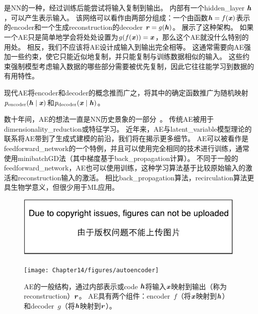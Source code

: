 \chapter{}
\label{chap:autoencoders}
是\gls{NN}的一种，经过训练后能尝试将输入复制到输出。
内部有一个\gls{hidden_layer} $\boldsymbol{\mathit{h}}$，可以产生表示输入。
该网络可以看作由两部分组成：一个由函数$ \boldsymbol{\mathit{h}} = f(\boldsymbol{\mathit{x}})$表示的\gls{encoder}和一个生成\gls{reconstruction}的\gls{decoder} $\boldsymbol{\mathit{r}}=g(\boldsymbol{\mathit{h}})$。
展示了这种架构。
如果一个\gls{AE}只是简单地学会将处处设置为$g(f(\boldsymbol{\mathit{x}})) =\boldsymbol{\mathit{x}}$，那么这个\gls{AE}就没什么特别的用处。
相反，我们不应该将\gls{AE}设计成输入到输出完全相等。
这通常需要向\gls{AE}强加一些约束，使它只能近似地复制，并只能复制与训练数据相似的输入。
这些约束强制模型考虑输入数据的哪些部分需要被优先复制，因此它往往能学习到数据的有用特性。


现代\gls{AE}将\gls{encoder}和\gls{decoder}的概念推而广之，将其中的确定函数推广为随机映射$p_{\text{encoder}} (\boldsymbol{\mathit{h}} \mid \boldsymbol{\mathit{x}})$和$p_{\text{decoder}}(\boldsymbol{\mathit{x}} \mid \boldsymbol{\mathit{h}})$。


数十年间，\gls{AE}的想法一直是\gls{NN}历史景象的一部分~\citep{Lecun-these87,Bourlard88,hinton1994amd-small}。
传统\gls{AE}被用于\gls{dimensionality_reduction}或特征学习。
近年来，\gls{AE}与\gls{latent_variable}模型理论的联系将\gls{AE}带到了生成式建模的前沿，我们将在揭示更多细节。
\gls{AE}可以被看作是\gls{feedforward_network}的一个特例，并且可以使用完全相同的技术进行训练，通常使用\gls{minibatch}\gls{GD}法（其中梯度基于\gls{back_propagation}计算）。
不同于一般的\gls{feedforward_network}，\gls{AE}也可以使用训练\citep{Hinton+McClelland-NIPS1987}，这种学习算法基于比较原始输入的激活和\gls{reconstruction}输入的激活。
相比\gls{back_propagation}算法，\gls{recirculation}算法更具生物学意义，但很少用于\gls{ML}应用。

\begin{figure}[!htb]
\ifOpenSource
\centerline{\includegraphics{figure.pdf}}
\else
\centerline{\texttt{[image: Chapter14/figures/autoencoder]}}
\fi
\caption{\gls{AE}的一般结构，通过内部表示或\gls{code} $\boldsymbol{\mathit{h}}$将输入$\boldsymbol{\mathit{x}}$映射到输出（称为\gls{reconstruction}）$\boldsymbol{\mathit{r}}$。
\gls{AE}具有两个组件：\gls{encoder}~$f$（将$\boldsymbol{\mathit{x}}$映射到$\boldsymbol{\mathit{h}}$）和\gls{decoder}~$g$（将$\boldsymbol{\mathit{h}}$映射到$\boldsymbol{\mathit{r}}$）。
}
\label{fig:chap14_autoencoder}
\end{figure}

